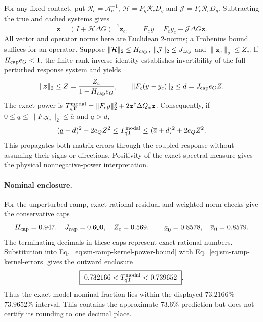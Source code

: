 For any fixed contact, put $\mathcal R_c=\mathcal A_c^{-1}$,
$\mathcal H=P_\eta\mathcal R_cD_g$ and $\mathcal J=F_c\mathcal R_cD_g$.
Subtracting the true and cached systems gives
\begin{equation}
 \bm z=(I+\mathcal H\Delta G)^{-1}\bm z_c,
 \qquad F_cy=F_cy_c-\mathcal J\Delta G\bm z.
 \label{eq:sm-ramp-source-output-identity}
\end{equation}
All vector and operator norms here are Euclidean $2$-norms; a Frobenius bound suffices for an operator. Suppose
$\|\mathcal H\|_2\le H_{\rm cap}$,
$\|\mathcal J\|_2\le J_{\rm cap}$ and
$\|\bm z_c\|_2\le Z_c$.
If $H_{\rm cap}e_G<1$, the finite-rank inverse identity establishes invertibility of the full perturbed response system and yields
\begin{equation}
 \|\bm z\|_2\le Z=\frac{Z_c}{1-H_{\rm cap}e_G},
 \qquad \|F_c(y-y_c)\|_2\le d=J_{\rm cap}e_GZ.
 \label{eq:sm-ramp-source-output-caps}
\end{equation}
The exact power is
$T_{\mathrm{qT}}^{\rm modal}=\|F_cy\|_2^2+2\bm z^\dagger\Delta Q_\star\bm z$.
Consequently, if $0\le\underline a\le\|F_cy_c\|_2\le\overline a$ and $\underline a>d$,
\begin{equation}
 (\underline a-d)^2-2e_QZ^2
 \le T_{\mathrm{qT}}^{\rm modal}
 \le(\overline a+d)^2+2e_QZ^2.
 \label{eq:sm-ramp-kernel-power-bound}
\end{equation}
This propagates both matrix errors through the coupled response without assuming their signs or directions. Positivity of the exact spectral measure gives the physical nonnegative-power interpretation.

\paragraph*{Nominal enclosure.}
For the unperturbed ramp, exact-rational residual and weighted-norm checks give the conservative caps
\begin{equation}
 H_{\rm cap}=0.947,\quad J_{\rm cap}=0.600,\quad Z_c=0.569,
 \qquad \underline a_0=0.8578,\quad\overline a_0=0.8579.
 \label{eq:sm-ramp-nominal-caps}
\end{equation}
The terminating decimals in these caps represent exact rational numbers. Substitution into Eq.~\eqref{eq:sm-ramp-kernel-power-bound} with Eq.~\eqref{eq:sm-ramp-kernel-errors} gives the outward enclosure
\begin{equation}
 \boxed{\ 0.732166<T_{\qT}^{\rm modal}<0.739652\ }.
 \label{eq:sm-ramp-nominal-enclosure}
\end{equation}
Thus the exact-model nominal fraction lies within the displayed $73.2166\%$--$73.9652\%$ interval. This contains the approximate $73.6\%$ prediction but does not certify its rounding to one decimal place.

